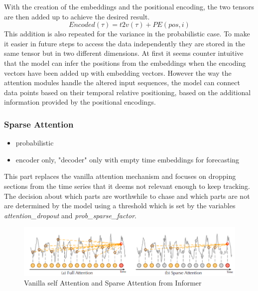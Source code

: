 \documentclass{article}
\begin{document}
With the creation of the embeddings and the positional encoding, the two tensors are then added up to achieve the desired result.
\begin{equation}
    Encoded(\tau) = t2v(\tau) + PE(pos,i)
\end{equation}
This addition is also repeated for the variance in the probabilistic case. To make it easier in future steps to access the data independently they are stored in the same tensor but in two different dimensions.
At first it seems counter intuitive that the model can infer the positions from the embeddings when the encoding vectors have been added up with embedding vectors. However the way the attention modules handle the altered input sequences, the model can connect data points based on their temporal relative positioning, based on the additional information provided by the positional encodings.

\subsubsection{Sparse Attention}

\begin{itemize}
    \item probabilistic
    \item encoder only, "decoder" only with empty time embeddings for forecasting
\end{itemize}

This part replaces the vanilla attention mechanism and focuses on dropping sections from the time series that it deems not relevant enough to keep tracking. The decision about which parts are worthwhile to chase and which parts are not are determined by the model using a threshold which is set by the variables \textit{attention\_dropout} and \textit{prob\_sparse\_factor}.

\begin{figure}[!ht]
    \centering
    \includegraphics[width=\linewidth]{graphs/Sparse_Attention_Example.png}
    \caption{Vanilla self Attention and Sparse Attention from Informer}
    \label{fig:sparse_attention}
\end{figure}
\end{document}

